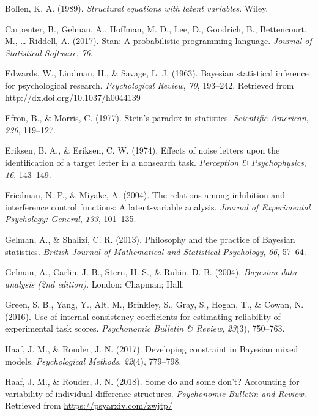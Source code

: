 \documentclass[english,man]{apa6}
\theoremstyle{definition}
\theoremstyle{definition}
\theoremstyle{definition}
\theoremstyle{remark}
\begin{document}
\hypertarget{ref-Bollen:1989}{}
Bollen, K. A. (1989). \emph{Structural equations with latent variables}.
Wiley.

\hypertarget{ref-Carpenter:etal:2017}{}
Carpenter, B., Gelman, A., Hoffman, M. D., Lee, D., Goodrich, B.,
Bettencourt, M., \ldots{} Riddell, A. (2017). Stan: A probabilistic
programming language. \emph{Journal of Statistical Software}, \emph{76}.

\hypertarget{ref-Edwards:etal:1963}{}
Edwards, W., Lindman, H., \& Savage, L. J. (1963). Bayesian statistical
inference for psychological research. \emph{Psychological Review},
\emph{70}, 193--242. Retrieved from
\url{http://dx.doi.org/10.1037/h0044139}

\hypertarget{ref-Efron:Morris:1977}{}
Efron, B., \& Morris, C. (1977). Stein's paradox in statistics.
\emph{Scientific American}, \emph{236}, 119--127.

\hypertarget{ref-Eriksen:Eriksen:1974}{}
Eriksen, B. A., \& Eriksen, C. W. (1974). Effects of noise letters upon
the identification of a target letter in a nonsearch task.
\emph{Perception \& Psychophysics}, \emph{16}, 143--149.

\hypertarget{ref-Friedman:Miyake:2004}{}
Friedman, N. P., \& Miyake, A. (2004). The relations among inhibition
and interference control functions: A latent-variable analysis.
\emph{Journal of Experimental Psychology: General}, \emph{133},
101--135.

\hypertarget{ref-Gelman:Shalizi:2013}{}
Gelman, A., \& Shalizi, C. R. (2013). Philosophy and the practice of
Bayesian statistics. \emph{British Journal of Mathematical and
Statistical Psychology}, \emph{66}, 57--64.

\hypertarget{ref-Gelman:etal:2004}{}
Gelman, A., Carlin, J. B., Stern, H. S., \& Rubin, D. B. (2004).
\emph{Bayesian data analysis (2nd edition)}. London: Chapman; Hall.

\hypertarget{ref-Green:etal:2016}{}
Green, S. B., Yang, Y., Alt, M., Brinkley, S., Gray, S., Hogan, T., \&
Cowan, N. (2016). Use of internal consistency coefficients for
estimating reliability of experimental task scores. \emph{Psychonomic
Bulletin \& Review}, \emph{23}(3), 750--763.

\hypertarget{ref-Haaf:Rouder:2017}{}
Haaf, J. M., \& Rouder, J. N. (2017). Developing constraint in Bayesian
mixed models. \emph{Psychological Methods}, \emph{22}(4), 779--798.

\hypertarget{ref-Haaf:Rouder:inpress}{}
Haaf, J. M., \& Rouder, J. N. (2018). Some do and some don't? Accounting
for variability of individual difference structures. \emph{Psychonomic
Bulletin and Review}. Retrieved from \url{https://psyarxiv.com/zwjtp/}
\end{document}
